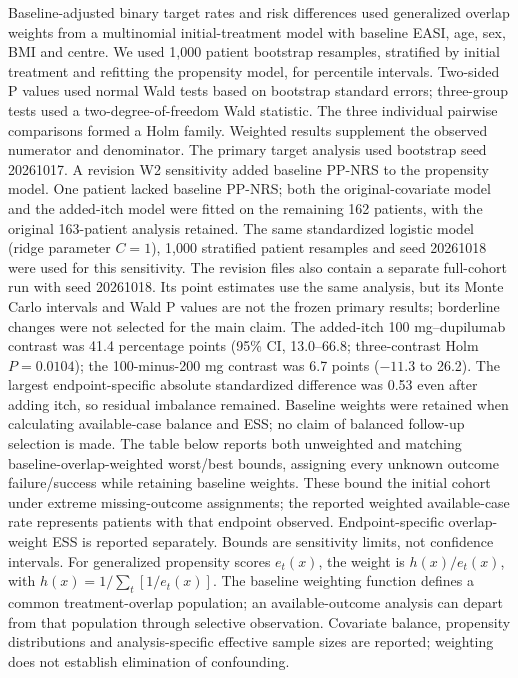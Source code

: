\documentclass[10pt,a4paper]{article}
\begin{document}
Baseline-adjusted binary target rates and risk differences used generalized overlap weights from a multinomial initial-treatment model with baseline EASI, age, sex, BMI and centre. We used 1,000 patient bootstrap resamples, stratified by initial treatment and refitting the propensity model, for percentile intervals. Two-sided P values used normal Wald tests based on bootstrap standard errors; three-group tests used a two-degree-of-freedom Wald statistic. The three individual pairwise comparisons formed a Holm family. Weighted results supplement the observed numerator and denominator. The primary target analysis used bootstrap seed 20261017. A revision W2 sensitivity added baseline PP-NRS to the propensity model. One patient lacked baseline PP-NRS; both the original-covariate model and the added-itch model were fitted on the remaining 162 patients, with the original 163-patient analysis retained. The same standardized logistic model (ridge parameter $C=1$), 1,000 stratified patient resamples and seed 20261018 were used for this sensitivity. The revision files also contain a separate full-cohort run with seed 20261018. Its point estimates use the same analysis, but its Monte Carlo intervals and Wald P values are not the frozen primary results; borderline changes were not selected for the main claim. The added-itch 100 mg--dupilumab contrast was 41.4 percentage points (95\% CI, 13.0--66.8; three-contrast Holm $P=0.0104$); the 100-minus-200 mg contrast was 6.7 points ($-11.3$ to 26.2). The largest endpoint-specific absolute standardized difference was 0.53 even after adding itch, so residual imbalance remained. Baseline weights were retained when calculating available-case balance and ESS; no claim of balanced follow-up selection is made. The table below reports both unweighted and matching baseline-overlap-weighted worst/best bounds, assigning every unknown outcome failure/success while retaining baseline weights. These bound the initial cohort under extreme missing-outcome assignments; the reported weighted available-case rate represents patients with that endpoint observed. Endpoint-specific overlap-weight ESS is reported separately. Bounds are sensitivity limits, not confidence intervals.
 For generalized propensity scores $e_t(x)$, the weight is $h(x)/e_t(x)$, with $h(x)=1/\sum_t[1/e_t(x)]$. The baseline weighting function defines a common treatment-overlap population; an available-outcome analysis can depart from that population through selective observation. Covariate balance, propensity distributions and analysis-specific effective sample sizes are reported; weighting does not establish elimination of confounding.\citep{lili2019}
\end{document}
